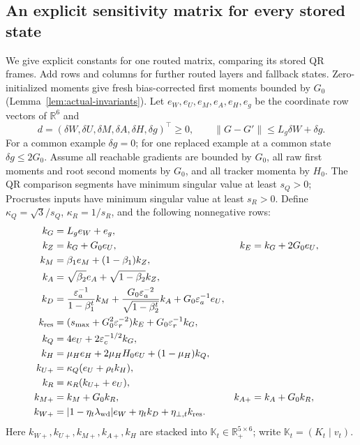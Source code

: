 \subsection{An explicit sensitivity matrix for every stored state}
\label{app:explicit-state-matrix}
We give explicit constants for one routed matrix, comparing its stored QR
frames. Add rows and columns for further routed layers and fallback states.
Zero-initialized moments give fresh bias-corrected first moments bounded
by $G_0$ (Lemma~\ref{lem:actual-invariants}). Let
$e_W,e_U,e_M,e_A,e_H,e_g$ be the coordinate row vectors of
$\mathbb R^6$ and
\begin{equation}
 d=(\delta W,\delta U,\delta M,\delta A,\delta H,\delta g)^{\top}\ge0,
 \qquad\|G-G'\|\le L_g\delta W+\delta g.
\end{equation}
For a common example $\delta g=0$; for one replaced example at a common
state $\delta g\le2G_0$. Assume all reachable gradients are bounded by
$G_0$, all raw first moments and root second moments by $G_0$, and all
tracker momenta by $H_0$. The QR comparison segments have minimum singular
value at least $s_Q>0$; Procrustes inputs have minimum singular value at
least $s_R>0$. Define $\kappa_Q=\sqrt3/s_Q$,
$\kappa_R=1/s_R$, and the following nonnegative rows:
\begin{align}
 k_G&=L_ge_W+e_g,\\
 k_Z&=k_G+G_0e_U, & k_E&=k_G+2G_0e_U,\\
 k_M&=\beta_1e_M+(1-\beta_1)k_Z,\\
 k_A&=\sqrt{\beta_2}e_A+\sqrt{1-\beta_2}k_Z,\\
 k_D&=\frac{\varepsilon_a^{-1}}{1-\beta_1^t}k_M
       +\frac{G_0\varepsilon_a^{-2}}{\sqrt{1-\beta_2^t}}k_A
       +G_0\varepsilon_a^{-1}e_U,\\
 k_{\rm res}&=(s_{\max}+G_0^2\varepsilon_r^{-2})k_E
                          +G_0\varepsilon_r^{-1}k_G,\\
 k_Q&=4e_U+2\varepsilon_c^{-1/2}k_G,\\
 k_H&=\mu_He_H+2\mu_HH_0e_U+(1-\mu_H)k_Q,\\
 k_{U+}&=\kappa_Q(e_U+\rho_t k_H),\\
 k_R&=\kappa_R(k_{U+}+e_U),\\
 k_{M+}&=k_M+G_0k_R,& k_{A+}&=k_A+G_0k_R,\\
 k_{W+}&=|1-\eta_t\lambda_{\rm wd}|e_W
                         +\eta_t k_D+\eta_{\perp,t} k_{\rm res}.
 \label{eq:all-state-rows}
\end{align}
Here $k_{W+},k_{U+},k_{M+},k_{A+},k_H$ are stacked into
$\mathbb K_t\in\mathbb R_+^{5\times6}$; write
$\mathbb K_t=(K_t\mid v_t)$.


